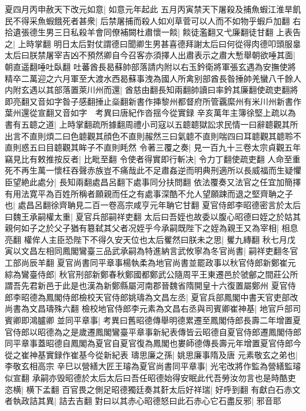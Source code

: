 夏四月丙申赦天下改元如意|{
	如意元年起此}
五月丙寅禁天下屠殺及捕魚蝦江淮旱飢民不得采魚蝦餓死者甚衆|{
	后禁屠捕而殺人如刈草菅可以人而不如物乎蝦戶加翻}
右拾遺張德生男三日私殺羊會同僚補闕杜肅懷一餤|{
	餤徒濫翻又弋廉翻徒甘翻}
上表告之|{
	上時掌翻}
明日太后對仗謂德曰聞卿生男甚喜德拜謝太后曰何從得肉德叩頭服辠太后曰朕禁屠宰吉凶不預然卿自今召客亦須擇人出肅表示之肅大慙舉朝欲唾其面|{
	朝直遥翻唾吐臥翻}
吐蕃酋長曷蘇帥部落請内附以右玉鈐衛將軍張玄遇為安撫使將精卒二萬迎之六月軍至大渡水西曷蘇事洩為國人所禽别部酋長昝捶帥羌蠻八千餘人内附玄遇以其部落置萊川州而還|{
	酋慈由翻長知兩翻帥讀曰率鈐其廉翻使疏吏翻將即亮翻又音如字昝子感翻捶止橤翻新書作挿黎州都督府所管覊縻州有米川州新書作葉州還從宣翻又音如字　考異曰唐紀作沓揺今從實録}
辛亥萬年主簿徐堅上疏以為書有五聼之道|{
	上時掌翻疏所據翻周禮小司寇以五聼聼獄訟求民情一曰辭聼觀其所出言不直則煩二曰色聼觀其顔色不直則赧然三曰氣聼不直則喘四曰耳聼觀其聼聆不直則惑五曰目聼觀其眸子不直則眊然}
令著三覆之奏|{
	見一百九十三卷太宗貞觀五年}
竊見比有敕推按反者|{
	比毗至翻}
令使者得實即行斬决|{
	令力丁翻使疏吏翻}
人命至重死不再生萬一懷枉吞聲赤族豈不痛哉此不足肅姦逆而明典刑適所以長威福而生疑懼臣望絶此處分|{
	長知兩翻處昌呂翻下處事同分扶問翻}
依法覆奏又法官之任宜加簡擇有用法寛平為百姓所稱者願親而任之有處事深酷不允人望願踈而退之堅齊聃之子也|{
	處昌呂翻徐齊聃見二百一卷高宗咸亨元年聃它甘翻}
夏官侍郎李昭德密言於太后曰魏王承嗣權太重|{
	夏官兵部嗣祥吏翻}
太后曰吾姪也故委以腹心昭德曰姪之於姑其親何如子之於父子猶有簒弑其父者况姪乎今承嗣既陛下之姪為親王又為宰相|{
	相息亮翻}
權侔人主臣恐陛下不得久安天位也太后矍然曰朕未之思|{
	矍九縳翻}
秋七月戊寅以文昌左相同鳳閣鸞臺三品武承嗣為特進納言武攸寧為冬官尚書|{
	嗣祥吏翻冬官工部尚辰羊翻}
夏官尚書同平章事楊執柔為地官尚書並罷政事以秋官侍郎新鄭崔元綜為鸞臺侍郎|{
	秋官刑部新鄭春秋鄭國都鄭武公隨周平王東遷邑於虢鄶之間莊公所謂吾先君新邑于此是也漢為新鄭縣屬河南郡晉魏省隋開皇十六復置屬鄭州}
夏官侍郎李昭德為鳳閣侍郎檢校天官侍郎姚璹為文昌左丞|{
	夏官兵部鳳閣中書天官吏部改尚書為文昌璹殊六翻}
檢校地官侍郎李元素為文昌右丞與司賓卿崔神基|{
	地官戶部司賓卿即鴻臚卿}
並同平章事|{
	考異曰舊昭德傳舉明德累遷至鳳閣侍郎長壽二年增置夏官侍郎以昭德為之是歲遷鳳閣鸞臺平章事新紀表傳皆云昭德自夏官侍郎遷鳳閣侍郎同平章事蓋昭德自鳳閣為夏官自夏官復為鳳閣也婁師德傳長壽元年增置夏官侍郎今從之崔神基實録作崔基今從新紀表}
璹思廉之孫|{
	姚思廉事隋及唐}
元素敬玄之弟也|{
	李敬玄相高宗}
辛巳以營繕大匠王璿為夏官尚書同平章事|{
	光宅改將作監為營繕監璿似宣翻}
承嗣亦毁昭德於太后太后曰吾任昭德始得安眠此代吾勞汝勿言也是時酷吏恣横|{
	横下孟翻}
百官畏之側足昭德獨廷奏其姧太后好祥瑞|{
	好呼到翻}
有獻白石赤文者執政詰其異|{
	詰去吉翻}
對曰以其赤心昭德怒曰此石赤心它石盡反邪|{
	邪音耶}
